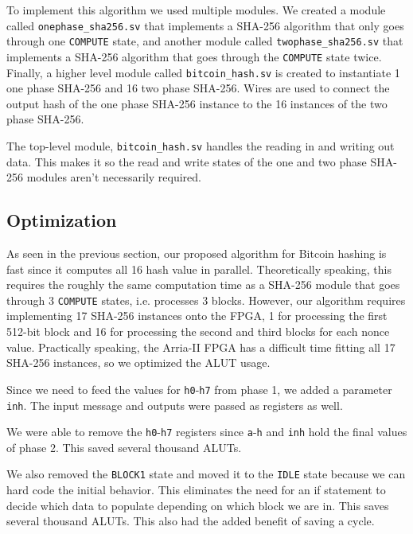 \documentclass{article}
\begin{document}
To implement this algorithm we used multiple modules. We created a module called \verb|onephase_sha256.sv| that implements a SHA-256 algorithm that only goes through one \verb|COMPUTE| state, and another module called \verb|twophase_sha256.sv| that implements a SHA-256 algorithm that goes through the \verb|COMPUTE| state twice. Finally, a higher level module called \verb|bitcoin_hash.sv| is created to instantiate 1 one phase SHA-256 and 16 two phase SHA-256. Wires are used to connect the output hash of the one phase SHA-256 instance to the 16 instances of the two phase SHA-256. 

The top-level module, \verb|bitcoin_hash.sv| handles the reading in and writing out data. This makes it so the read and write states of the one and two phase SHA-256 modules aren't necessarily required. 

\subsection{Optimization}

As seen in the previous section, our proposed algorithm for Bitcoin hashing is fast since it computes all 16 hash value in parallel. Theoretically speaking, this requires the roughly the same computation time as a SHA-256 module that goes through 3 \verb|COMPUTE| states, i.e. processes 3 blocks. However, our algorithm requires implementing 17 SHA-256 instances onto the FPGA, 1 for processing the first 512-bit block and 16 for processing the second and third blocks for each nonce value. Practically speaking, the Arria-II FPGA has a difficult time fitting all 17 SHA-256 instances, so we optimized the ALUT usage.

Since we need to feed the values for \verb|h0|-\verb|h7| from phase 1, we added a parameter \verb|inh|. The input message and outputs were passed as registers as well.



We were able to remove the \verb|h0|-\verb|h7| registers since \verb|a|-\verb|h| and \verb|inh| hold the final values of phase 2. This saved several thousand ALUTs.


We also removed the \verb|BLOCK1| state and moved it to the \verb|IDLE| state because we can hard code the initial behavior. This eliminates the need for an if statement to decide which data to populate depending on which block we are in. This saves several thousand ALUTs. This also had the added benefit of saving a cycle.

\end{document}
